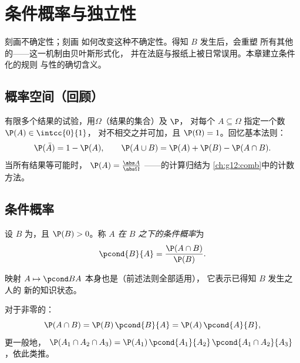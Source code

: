 \chapter{条件概率与独立性}\label{ch:g12:condprob}

刻画不确定性；刻画
如何改变这种不确定性。得知 $B$ 发生后，会重塑
所有其他的——这一机制由贝叶斯形式化，
并在法庭与报纸上被日常误用。本章建立条件化的规则
与性的确切含义。

\section{概率空间（回顾）}

有限多个结果的试验，用\emph{}$\Omega$（结果的集合）及 $\P$，
对每个 $A \subseteq \Omega$ 指定一个数 $\P(A) \in \intcc{0}{1}$，
对不相交之并可加，且 $\P(\Omega) = 1$。回忆基本法则：
\[
\P(\bar A) = 1 - \P(A),
\qquad
\P(A \cup B) = \P(A) + \P(B) - \P(A \cap B).
\]
当所有结果等可能时，
$\P(A) = \frac{\abs A}{\abs\Omega}$ ——的计算归结为
\cref{ch:g12:comb}中的计数方法。

\section{条件概率}

\begin{definition}[条件概率]\label{def:g12:condprob:cond}
设 $B$ 为，且 $\P(B) > 0$。称 \emph{$A$ 在
$B$ 之下的条件概率}为
\[
\pcond{B}{A} = \frac{\P(A \cap B)}{\P(B)} .
\]
\end{definition}

映射 $A \mapsto \pcond BA$ 本身也是（前述法则全部适用），
它表示已得知 $B$ 发生之人的
新的知识状态。

\begin{proposition}[乘法法则]\label{prop:g12:condprob:product}
对于非零的：
\[
\P(A \cap B) = \P(B)\,\pcond{B}{A} = \P(A)\,\pcond{A}{B},
\]
更一般地，
$\P(A_1 \cap A_2 \cap A_3) = \P(A_1)\,\pcond{A_1}{A_2}\,
\pcond{A_1 \cap A_2}{A_3}$，依此类推。
\end{proposition}

